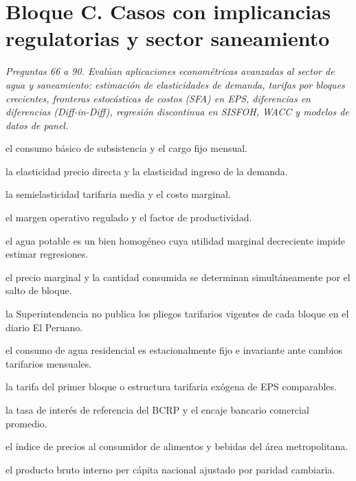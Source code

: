 \section*{Bloque C. Casos con implicancias regulatorias y sector saneamiento}

\noindent\textit{Preguntas 66 a 90. Evalúan aplicaciones econométricas avanzadas al sector de agua y saneamiento: estimación de elasticidades de demanda, tarifas por bloques crecientes, fronteras estocásticas de costos (SFA) en EPS, diferencias en diferencias (Diff-in-Diff), regresión discontinua en SISFOH, WACC y modelos de datos de panel.}

\begin{opts}
    \item el consumo básico de subsistencia y el cargo fijo mensual.
    \item la elasticidad precio directa y la elasticidad ingreso de la demanda.
    \item la semielasticidad tarifaria media y el costo marginal.
    \item el margen operativo regulado y el factor de productividad.
\end{opts}

\begin{opts}
    \item el agua potable es un bien homogéneo cuya utilidad marginal decreciente impide estimar regresiones.
    \item el precio marginal y la cantidad consumida se determinan simultáneamente por el salto de bloque.
    \item la Superintendencia no publica los pliegos tarifarios vigentes de cada bloque en el diario El Peruano.
    \item el consumo de agua residencial es estacionalmente fijo e invariante ante cambios tarifarios mensuales.
\end{opts}

\begin{opts}
    \item la tarifa del primer bloque o estructura tarifaria exógena de EPS comparables.
    \item la tasa de interés de referencia del BCRP y el encaje bancario comercial promedio.
    \item el índice de precios al consumidor de alimentos y bebidas del área metropolitana.
    \item el producto bruto interno per cápita nacional ajustado por paridad cambiaria.
\end{opts}

